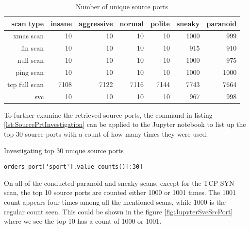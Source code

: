 \begin{table}[htbp]
\caption{Number of unique source ports}
\begin{center}

\begin{tabular}{|r|r|r|r|r|r|r|}
\hline
scan type & insane & aggressive & normal & polite & sneaky & paranoid\\
\hline
xmas scan & 10 & 10 & 10 & 10 & 1000 & 999\\
\hline
fin scan & 10 & 10 & 10 & 10 & 915 & 910\\
\hline
null scan & 10 & 10 & 10 & 10 & 1000 & 975\\
\hline
ping scan & 10 & 10 & 10 & 10 & 1000 & 1000\\
\hline
tcp full scan & 7108 & 7122 & 7116 & 7144 & 7743 & 7664\\
\hline
svc & 10 & 10 & 10 & 10 & 967 & 998\\
\hline
\end{tabular}
\label{tbl:UniqueSourcePorts}
\end{center}
\end{table}

To further examine the retrieved source ports, the command in listing \ref{lst:SourcePrtInvestigation} can be applied to the Jupyter notebook to list up the top 30 source ports with a count of how many times they were used.

\begin{listing}[!ht]
\caption{Investigating top 30 unique source ports}
\label{lst:SourcePrtInvestigation}
\begin{verbatim}
orders_port['sport'].value_counts()[:30]
\end{verbatim}
\end{listing}

On all of the conducted paranoid and sneaky scans, except for the TCP SYN scan, the top 10 source ports are counted either 1000 or 1001 times. The 1001 count appears four times among all the mentioned scans, while 1000 is the regular count seen. This could be shown in the figure \ref{fig:JupyterSvcSrcPort} where we see the top 10 has a count of 1000 or 1001.

